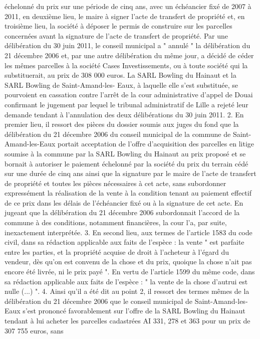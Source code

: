 \documentclass[11pt,a4paper]{report}
\begin{document}
	échelonné du prix sur une période de cinq ans, avec un échéancier fixé de 2007 à 2011, en deuxième lieu, le
	maire à signer l'acte de transfert de propriété et, en troisième lieu, la société à déposer le permis de construire
	sur les parcelles concernées avant la signature de l'acte de transfert de propriété. Par une délibération du 30
	juin 2011, le conseil municipal a " annulé " la délibération du 21 décembre 2006 et, par une autre délibération
	du même jour, a décidé de céder les mêmes parcelles à la société Cases Investissements, ou à toute société qui la
	substituerait, au prix de 308 000 euros. La SARL Bowling du Hainaut et la SARL Bowling de Saint-Amand-les-
	Eaux, à laquelle elle s'est substituée, se pourvoient en cassation contre l'arrêt de la cour administrative d'appel
	de Douai confirmant le jugement par lequel le tribunal administratif de Lille a rejeté leur demande tendant à
	l'annulation des deux délibérations du 30 juin 2011.
	2. En premier lieu, il ressort des pièces du dossier soumis aux juges du fond que la délibération du 21 décembre
	2006 du conseil municipal de la commune de Saint-Amand-les-Eaux portait acceptation de l'offre d'acquisition
	des parcelles en litige soumise à la commune par la SARL Bowling du Hainaut au prix proposé et se bornait à
	autoriser le paiement échelonné par la société du prix du terrain cédé sur une durée de cinq ans ainsi que la
	signature par le maire de l'acte de transfert de propriété et toutes les pièces nécessaires à cet acte, sans
	subordonner expressément la réalisation de la vente à la condition tenant au paiement effectif de ce prix dans les
	délais de l'échéancier fixé ou à la signature de cet acte. En jugeant que la délibération du 21 décembre 2006
	subordonnait l'accord de la commune à des conditions, notamment financières, la cour l'a, par suite,
	inexactement interprétée.
	3. En second lieu, aux termes de l'article 1583 du code civil, dans sa rédaction applicable aux faits de l'espèce :
	la vente " est parfaite entre les parties, et la propriété acquise de droit à l'acheteur à l'égard du vendeur, dès
	qu'on est convenu de la chose et du prix, quoique la chose n'ait pas encore été livrée, ni le prix payé ". En vertu
	de l'article 1599 du même code, dans sa rédaction applicable aux faits de l'espèce : " la vente de la chose
	d'autrui est nulle (...) ".
	4. Ainsi qu'il a été dit au point 2, il ressort des termes mêmes de la délibération du 21 décembre 2006 que le
	conseil municipal de Saint-Amand-les-Eaux s'est prononcé favorablement sur l'offre de la SARL Bowling du
	Hainaut tendant à lui acheter les parcelles cadastrées AI 331, 278 et 363 pour un prix de 307 755 euros, sans
\end{document}
